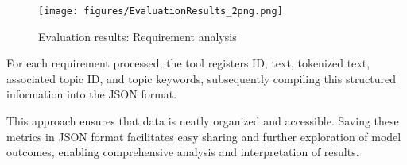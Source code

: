 \begin{figure}[h]
    \centering
    \texttt{[image: figures/EvaluationResults\_2png.png]}
    \caption{Evaluation results: Requirement analysis}
    \label{fig:EvaluationResults_2png}
\end{figure}

For each requirement processed, the tool registers ID, text, tokenized text, associated topic ID, and topic keywords, subsequently compiling this structured information into the JSON format. 

This approach ensures that data is neatly organized and accessible. Saving these metrics in JSON format facilitates easy sharing and further exploration of model outcomes, enabling comprehensive analysis and interpretation of results.


